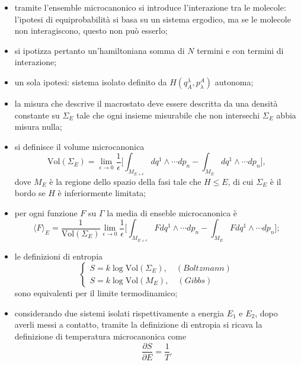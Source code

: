 \documentclass{article}
\theoremstyle{remark}
\begin{document}
\begin{itemize}
\begin{enumerate}
        \begin{equation}
            \Bar{f}=\lim_{T\to\infty}\int_0^Tf(x(t;x_0))dt=\frac{1}{\text{Vol}(\Gamma)}\int_{\Gamma}fd\mu;
        \end{equation}
    \end{enumerate}
    \item tramite l'ensemble microcanonico si introduce l'interazione tra le molecole: l'ipotesi di equiprobabilità si basa su un sistema ergodico, ma se le molecole non interagiscono, questo non può esserlo;
    \item si ipotizza pertanto un'hamiltoniana somma di $N$ termini e con termini di interazione;
    \item un sola ipotesi: sistema isolato definito da $H(q_A^\lambda,p_\lambda^A)$ autonoma;
    \item la misura che descrive il macrostato deve essere descritta da una densità constante su $\Sigma_E$ tale che ogni insieme misurabile che non intersechi $\Sigma_E$ abbia misura nulla;
    \item si definisce il volume microcanonica
    \begin{equation}
        \text{Vol}(\Sigma_E)=\lim_{\epsilon\to0}\frac{1}{\epsilon}\bigg[\int_{M_{E+\epsilon}}dq^1\wedge\cdots dp_n-\int_{M_E}dq^1\wedge\cdots dp_n\bigg],
    \end{equation}
    dove $M_E$ è la regione dello spazio della fasi tale che $H\le E$, di cui $\Sigma_E$ è il bordo se $H$ è inferiormente limitata;
    \item per ogni funzione $F$ su $\Gamma$ la media di enseble microcanonica è
    \begin{equation}
        \langle F\rangle_E=\frac{1}{\text{Vol}(\Sigma_E)}\lim_{\epsilon\to0}\frac{1}{\epsilon}\bigg[\int_{M_{E+\epsilon}}Fdq^1\wedge\cdots dp_n-\int_{M_E}Fdq^1\wedge\cdots dp_n\bigg];
    \end{equation}
    \item le definizioni di entropia
    \begin{equation}
        \begin{cases}
            S=k\log{\text{Vol}(\Sigma_E)},\quad(Boltzmann)\\
            S=k\log{\text{Vol}(M_E)},\quad(Gibbs)
        \end{cases}
    \end{equation}
    sono equivalenti per il limite termodinamico;
    \item considerando due sistemi isolati rispettivamente a energia $E_1$ e $E_2$, dopo averli messi a contatto, tramite la definizione di entropia si ricava la definizione di temperatura microcanonica come
    \begin{equation}
        \frac{\partial S}{\partial E}=\frac{1}{T}.
    \end{equation}
\end{itemize}
\end{document}
